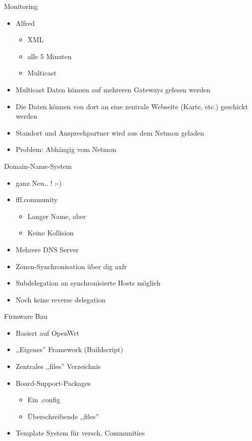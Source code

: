 \begin{frame}{Monitoring}
    \begin{itemize}
        \item Alfred
        \begin{itemize}
            \item XML
            \item alle 5 Minuten
            \item Multicast
        \end{itemize}
        \item Multicast Daten können auf mehreren Gateways gelesen werden
        \item Die Daten können von dort an eine zentrale Webseite (Karte, etc.) geschickt werden
        \item Standort und Ansprechpartner wird aus dem Netmon geladen
        \item Problem: Abhängig vom Netmon
    \end{itemize}
\end{frame}

\begin{frame}{Domain-Name-System}
    \begin{itemize}
        \item ganz Neu.. ! :-)
        \item fff.community
        \begin{itemize}
            \item Langer Name, aber
            \item Keine Kollision
        \end{itemize}
        \item Mehrere DNS Server
        \item Zonen-Synchronisation über dig axfr
        \item Subdelegation an synchronisierte Hosts möglich
        \item Noch keine reverse delegation
    \end{itemize}
\end{frame}

\begin{frame}{Firmware Bau}
    \begin{itemize}
        \item Basiert auf OpenWrt
        \item ,,Eigenes'' Framework (Buildscript)
        \item Zentrales ,,files'' Verzeichnis
        \item Board-Support-Packages
        \begin{itemize}
            \item Ein .config
            \item Überschreibende ,,files''
        \end{itemize}
        \item Template System für versch. Communities
    \end{itemize}
\end{frame}

